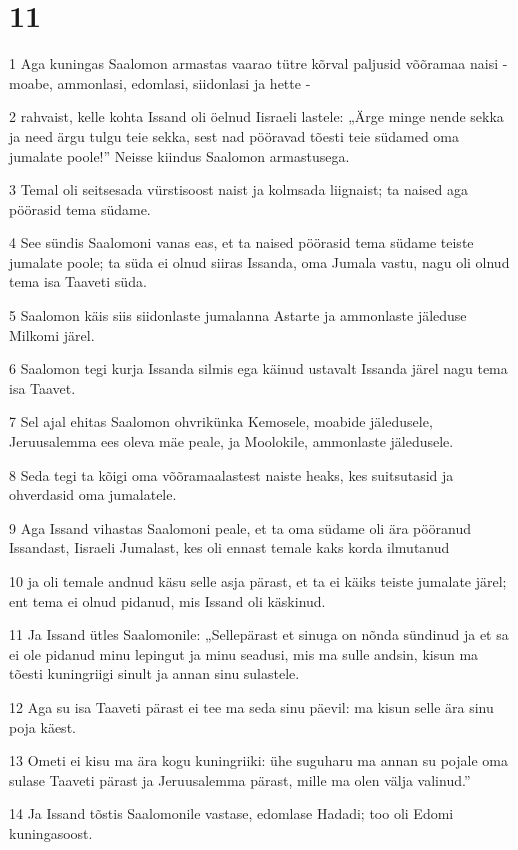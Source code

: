 \chapter{11}

\par 1 Aga kuningas Saalomon armastas vaarao tütre kõrval paljusid võõramaa naisi - moabe, ammonlasi, edomlasi, siidonlasi ja hette -
\par 2 rahvaist, kelle kohta Issand oli öelnud Iisraeli lastele: „Ärge minge nende sekka ja need ärgu tulgu teie sekka, sest nad pööravad tõesti teie südamed oma jumalate poole!” Neisse kiindus Saalomon armastusega.
\par 3 Temal oli seitsesada vürstisoost naist ja kolmsada liignaist; ta naised aga pöörasid tema südame.
\par 4 See sündis Saalomoni vanas eas, et ta naised pöörasid tema südame teiste jumalate poole; ta süda ei olnud siiras Issanda, oma Jumala vastu, nagu oli olnud tema isa Taaveti süda.
\par 5 Saalomon käis siis siidonlaste jumalanna Astarte ja ammonlaste jäleduse Milkomi järel.
\par 6 Saalomon tegi kurja Issanda silmis ega käinud ustavalt Issanda järel nagu tema isa Taavet.
\par 7 Sel ajal ehitas Saalomon ohvrikünka Kemosele, moabide jäledusele, Jeruusalemma ees oleva mäe peale, ja Moolokile, ammonlaste jäledusele.
\par 8 Seda tegi ta kõigi oma võõramaalastest naiste heaks, kes suitsutasid ja ohverdasid oma jumalatele.
\par 9 Aga Issand vihastas Saalomoni peale, et ta oma südame oli ära pööranud Issandast, Iisraeli Jumalast, kes oli ennast temale kaks korda ilmutanud
\par 10 ja oli temale andnud käsu selle asja pärast, et ta ei käiks teiste jumalate järel; ent tema ei olnud pidanud, mis Issand oli käskinud.
\par 11 Ja Issand ütles Saalomonile: „Sellepärast et sinuga on nõnda sündinud ja et sa ei ole pidanud minu lepingut ja minu seadusi, mis ma sulle andsin, kisun ma tõesti kuningriigi sinult ja annan sinu sulastele.
\par 12 Aga su isa Taaveti pärast ei tee ma seda sinu päevil: ma kisun selle ära sinu poja käest.
\par 13 Ometi ei kisu ma ära kogu kuningriiki: ühe suguharu ma annan su pojale oma sulase Taaveti pärast ja Jeruusalemma pärast, mille ma olen välja valinud.”
\par 14 Ja Issand tõstis Saalomonile vastase, edomlase Hadadi; too oli Edomi kuningasoost.
